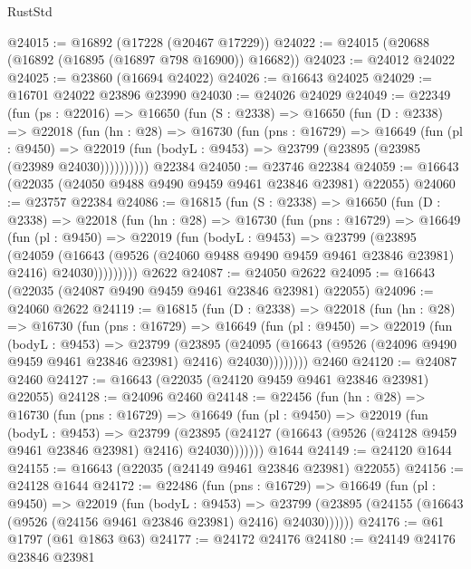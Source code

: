\begin{lexlean}{RustStd}
\begin{coremodule}
@24015 := @16892 (@17228 (@20467 @17229))
@24022 := @24015 (@20688 (@16892 (@16895 (@16897 @798 @16900)) @16682))
@24023 := @24012 @24022
@24025 := @23860 (@16694 @24022)
@24026 := @16643 @24025
@24029 := @16701 @24022 @23896 @23990
@24030 := @24026 @24029
@24049 := @22349
    (fun (ps : @22016) =>
    @16650
      (fun (S : @2338) =>
      @16650
        (fun (D : @2338) =>
        @22018
          (fun (hn : @28) =>
          @16730
            (fun (pns : @16729) =>
            @16649
              (fun (pl : @9450) =>
              @22019 (fun (bodyL : @9453) => @23799 (@23895 (@23985 (@23989 @24030))))))))))
    @22384
@24050 := @23746 @22384
@24059 := @16643 (@22035 (@24050 @9488 @9490 @9459 @9461 @23846 @23981) @22055)
@24060 := @23757 @22384
@24086 := @16815
    (fun (S : @2338) =>
    @16650
      (fun (D : @2338) =>
      @22018
        (fun (hn : @28) =>
        @16730
          (fun (pns : @16729) =>
          @16649
            (fun (pl : @9450) =>
            @22019
              (fun (bodyL : @9453) =>
              @23799
                (@23895
                  (@24059
                    (@16643
                      (@9526 (@24060 @9488 @9490 @9459 @9461 @23846 @23981) @2416)
                      @24030)))))))))
    @2622
@24087 := @24050 @2622
@24095 := @16643 (@22035 (@24087 @9490 @9459 @9461 @23846 @23981) @22055)
@24096 := @24060 @2622
@24119 := @16815
    (fun (D : @2338) =>
    @22018
      (fun (hn : @28) =>
      @16730
        (fun (pns : @16729) =>
        @16649
          (fun (pl : @9450) =>
          @22019
            (fun (bodyL : @9453) =>
            @23799
              (@23895
                (@24095
                  (@16643 (@9526 (@24096 @9490 @9459 @9461 @23846 @23981) @2416) @24030))))))))
    @2460
@24120 := @24087 @2460
@24127 := @16643 (@22035 (@24120 @9459 @9461 @23846 @23981) @22055)
@24128 := @24096 @2460
@24148 := @22456
    (fun (hn : @28) =>
    @16730
      (fun (pns : @16729) =>
      @16649
        (fun (pl : @9450) =>
        @22019
          (fun (bodyL : @9453) =>
          @23799
            (@23895 (@24127 (@16643 (@9526 (@24128 @9459 @9461 @23846 @23981) @2416) @24030)))))))
    @1644
@24149 := @24120 @1644
@24155 := @16643 (@22035 (@24149 @9461 @23846 @23981) @22055)
@24156 := @24128 @1644
@24172 := @22486
    (fun (pns : @16729) =>
    @16649
      (fun (pl : @9450) =>
      @22019
        (fun (bodyL : @9453) =>
        @23799 (@23895 (@24155 (@16643 (@9526 (@24156 @9461 @23846 @23981) @2416) @24030))))))
@24176 := @61 @1797 (@61 @1863 @63)
@24177 := @24172 @24176
@24180 := @24149 @24176 @23846 @23981

\end{coremodule}
\end{lexlean}
